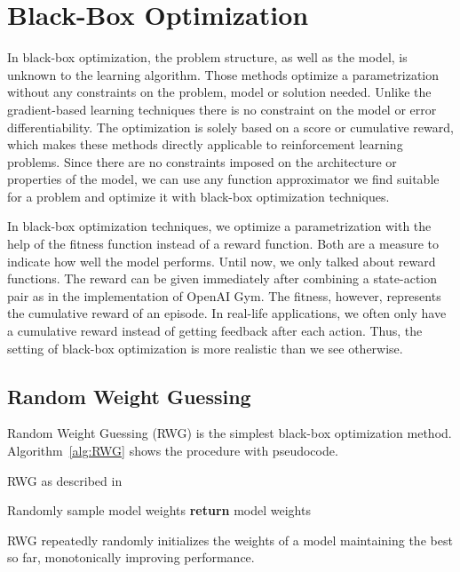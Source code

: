 
\section{Black-Box Optimization}
In black-box optimization, the problem structure, as well as the model, is unknown to the learning algorithm. Those methods optimize a parametrization without any constraints on the problem, model or solution needed. Unlike the gradient-based learning techniques there is no constraint on the model or error differentiability. The optimization is solely based on a score or cumulative reward, which makes these methods directly applicable to reinforcement learning problems. Since there are no constraints imposed on the architecture or properties of the model, we can use any function approximator we find suitable for a problem and optimize it with black-box optimization techniques.

In black-box optimization techniques, we optimize a parametrization with the help of the fitness function instead of a reward function. Both are a measure to indicate how well the model performs. Until now, we only talked about reward functions. The reward can be given immediately after combining a state-action pair as in the implementation of OpenAI Gym. The fitness, however, represents the cumulative reward of an episode. In real-life applications, we often only have a cumulative reward instead of getting feedback after each action. Thus, the setting of black-box optimization is more realistic than we see otherwise.

\subsection{Random Weight Guessing}
Random Weight Guessing (RWG) is the simplest black-box optimization method. Algorithm~\ref{alg:RWG} shows the procedure with pseudocode.
\begin{algorithm}
\caption{RWG as described in \cite{schmidhuber2001evaluating}}
\begin{algorithmic}[1]
\Repeat
    \State Randomly sample model weights
\State \textbf{return} model weights
\end{algorithmic}
\label{alg:RWG}
\end{algorithm}
RWG repeatedly randomly initializes the weights of a model maintaining the best so far, monotonically improving performance.

